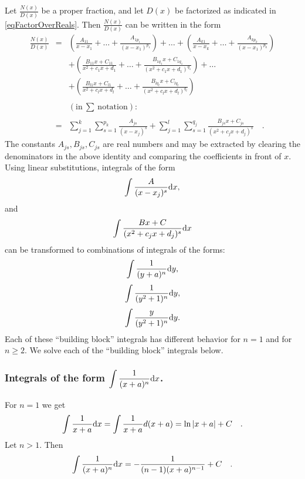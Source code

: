 \documentclass[12pt]{book}
\begin{document}
Let $\frac{N(x)}{D(x)}$ be a proper fraction, and let $D(x)$ be factorized as indicated in \eqref{eqFactorOverReals}. Then $\frac{N(x)}{D(x)}$ can be written in the form
\begin{equation}\label{eqSplitPF}
\begin{array}{rcl}
\displaystyle\frac{N(x)}{D(x)}&=&\displaystyle \left (\frac{A_{11}}{x-x_1}+\dots +\frac{A_{1p_1}}{(x-x_1)^{p_1}}\right) +\dots + \left (\frac{A_{k1}}{x-x_k}+\dots +\frac{A_{kp_k}}{(x-x_1)^{p_k}}\right) \\
&&\displaystyle+\left(\frac {B_{11}x+C_{11}}{x^2+c_1x+d_1}+\dots +\frac {B_{1q_1}x+C_{1q_1}}{(x^2+c_1x+d_1)^{q_1}} \right)+\dots
\\&&\displaystyle +
\left(\frac {B_{l1}x+C_{l1}}{x^2+c_lx+d_l}+\dots +\frac {B_{lq_l}x+C_{lq_l}}{(x^2+c_lx+d_l)^{q_l}} \right)\\ \\
&&(\mathrm{in~}\sum\mathrm{~notation}):\\ \\
&=&\displaystyle \sum_{j=1}^{k}\sum_{s=1}^{p_k} \frac{A_{js}}{(x-x_j)^s}+\sum_{j=1}^{l}\sum_{s=1}^{q_j} \frac{B_{js}x+C_{js}}{(x^2+c_jx+d_j)^s}\quad .
\end{array}
\end{equation}
The constants $A_{js}, B_{js}, C_{js}$ are real numbers and may be extracted by clearing the denominators in the above identity and comparing the coefficients in front of $x$.
Using linear substitutions, integrals of the form
\[
\displaystyle\int \frac{A}{(x-x_j)^s}{\normalfont \text{d}} x,
\]
and
\[
\int \frac{Bx+C}{(x^2+c_jx+d_j)^s}{\normalfont \text{d}} x
\]
can be transformed to combinations of integrals of the forms:
\[
\int \frac{1}{(y+a)^n}{\normalfont \text{d}} y,
\]
\[
\int \frac{1}{(y^2+1)^n}{\normalfont \text{d}} y,
\]
\[\int \frac{y}{(y^2+1)^n}{\normalfont \text{d}} y.
\]
Each of these ``building block'' integrals has different behavior for $n=1$ and for $n\geq 2$. We solve each of the ``building block'' integrals below.

\subsubsection{Integrals of the form $\displaystyle\int \frac{1}{(x+a)^n}{\normalfont \text{d}} x$.}
For $n=1$ we get
\begin{equation}\label{eqBuildingBlockInt1base}
\int \frac{1}{x+a}{\normalfont \text{d}} x=\int {\frac{1}{x+a}d(x+a)}= \ln |x+a| +C\quad .
\end{equation}
Let $n> 1$. Then
\begin{equation}\label{eqBuildingBlockInt1N}
\int \frac{1}{(x+a)^n}{\normalfont \text{d}} x= -\frac{1}{(n-1)(x+a)^{n-1}}+C \quad .
\end{equation}
\end{document}
